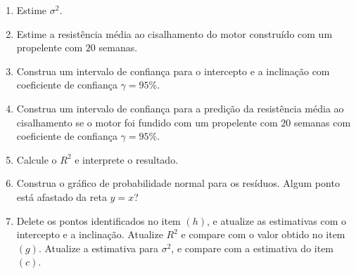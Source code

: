 \documentclass[12pt, a4paper]{article}
\begin{document}
\begin{enumerate}
\begin{enumerate}
		\item Estime $\sigma^2$.
		\item Estime a resistência média ao cisalhamento do motor construído com um propelente com $20$ semanas.
		\item Construa um intervalo de confiança para o intercepto e a inclinação com coeficiente de confiança $\gamma=95\%$.
		\item Construa um intervalo de confiança para a predição da resistência média ao cisalhamento se o motor foi fundido com um propelente com $20$ semanas com coeficiente de confiança $\gamma=95\%$.
		\item Calcule o $R^2$ e interprete o resultado.
		\item Construa o gráfico de probabilidade normal para os resíduos. Algum ponto está afastado da reta $y=x$?
		\item Delete os pontos identificados no item $(h)$, e atualize as estimativas com o intercepto e a inclinação. Atualize $R^2$   e compare com o valor obtido no item $(g)$. Atualize a estimativa para $\sigma^2$, e compare com a estimativa do item $(c)$.
	\end{enumerate}


\end{enumerate}
\end{document}
